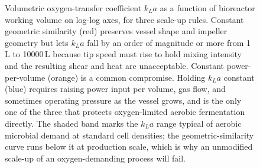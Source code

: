 \begin{figure}[htbp]
\begin{tikzpicture}
\end{tikzpicture}
\caption{Volumetric oxygen-transfer coefficient $k_L a$ as a function
of bioreactor working volume on log-log axes, for three scale-up rules.
Constant geometric similarity (red) preserves vessel shape and impeller
geometry but lets $k_L a$ fall by an order of magnitude or more from
1\,L to 10000\,L because tip speed must rise to hold mixing intensity
and the resulting shear and heat are unacceptable. Constant
power-per-volume (orange) is a common compromise. Holding $k_L a$
constant (blue) requires raising power input per volume, gas flow, and
sometimes operating pressure as the vessel grows, and is the only one
of the three that protects oxygen-limited aerobic fermentation directly.
The shaded band marks the $k_L a$ range typical of aerobic microbial
demand at standard cell densities; the geometric-similarity curve runs
below it at production scale, which is why an unmodified scale-up of an
oxygen-demanding process will fail.}
\label{fig:vol06ch10:kla-scale-up}
\end{figure}
